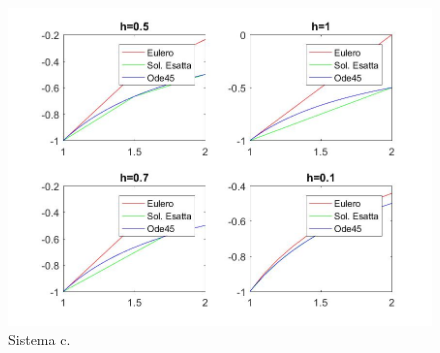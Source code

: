 \documentclass[11pt,a4paper,twoside,openright,titlepage,
headinclude,footinclude,BCOR5mm,
numbers=noenddot,cleardoublepage=empty,
tablecaptionabove]{scrbook}
\begin{document}
\begin{figure}[t!]
\centering
\includegraphics[width=\textwidth]{figs/ese2_4_c.jpg}
\caption{Sistema c.}
\end{figure}

\newpage
\end{document}
